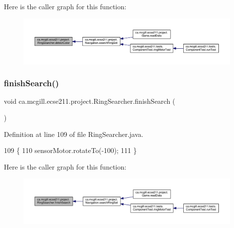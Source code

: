 Here is the caller graph for this function\+:
\nopagebreak
\begin{figure}[H]
\begin{center}
\leavevmode
\includegraphics[width=350pt]{classca_1_1mcgill_1_1ecse211_1_1project_1_1_ring_searcher_a997bf874ae5577c48719254677830fb7_icgraph}
\end{center}
\end{figure}
\mbox{\label{classca_1_1mcgill_1_1ecse211_1_1project_1_1_ring_searcher_a6edfdbd31d9848ff885e2e4caa3b46c6}} 
\subsubsection{\texorpdfstring{finish\+Search()}{finishSearch()}}
{\footnotesize\ttfamily void ca.\+mcgill.\+ecse211.\+project.\+Ring\+Searcher.\+finish\+Search (\begin{DoxyParamCaption}{ }\end{DoxyParamCaption})}



Definition at line 109 of file Ring\+Searcher.\+java.


\begin{DoxyCode}
109                              \{
110     sensorMotor.rotateTo(-100);
111   \}
\end{DoxyCode}
Here is the caller graph for this function\+:
\nopagebreak
\begin{figure}[H]
\begin{center}
\leavevmode
\includegraphics[width=350pt]{classca_1_1mcgill_1_1ecse211_1_1project_1_1_ring_searcher_a6edfdbd31d9848ff885e2e4caa3b46c6_icgraph}
\end{center}
\end{figure}
\mbox{\label{classca_1_1mcgill_1_1ecse211_1_1project_1_1_ring_searcher_a3de30b85b1445157d7f8572992de7651}} 
